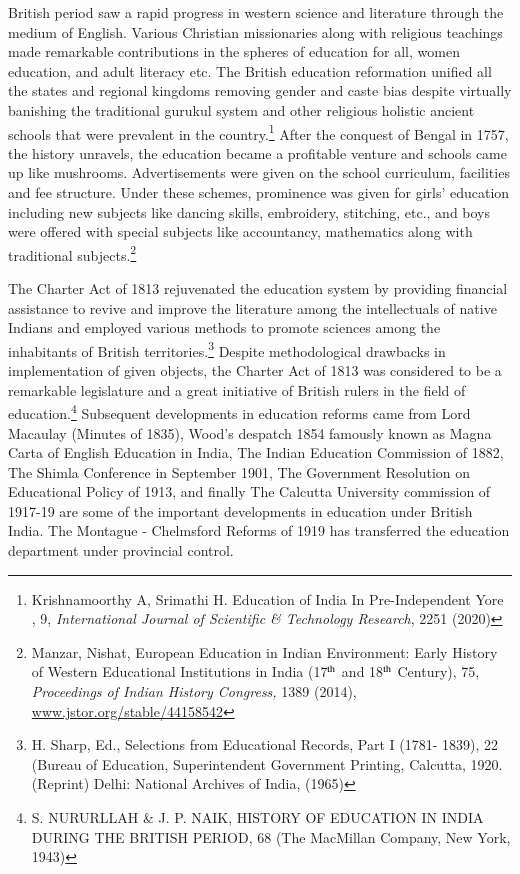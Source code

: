 \begin{multicols}{2}
\noi
British period saw a rapid progress in western science and literature through the medium of
English. Various Christian missionaries along with religious teachings made remarkable
contributions in the spheres of education for all, women education, and adult literacy etc. The
British education reformation unified all the states and regional kingdoms removing gender
and caste bias despite virtually banishing the traditional gurukul system and other religious
holistic ancient schools that were prevalent in the country.\footnote{Krishnamoorthy A, Srimathi H. Education of India In Pre-Independent Yore , 9, \textit{International Journal of Scientific \& Technology Research}, 2251 (2020)} After the conquest of Bengal in 1757, the history unravels, the education became a profitable venture and schools came up
like mushrooms. Advertisements were given on the school curriculum, facilities and fee
structure. Under these schemes, prominence was given for girls’ education including new
subjects like dancing skills, embroidery, stitching, etc., and boys were offered with special
subjects like accountancy, mathematics along with traditional subjects.\footnote{Manzar, Nishat, European Education in Indian Environment: Early History of Western Educational Institutions in India (17$^{\rm th}$ and 18$^{\rm th}$ Century), 75, \textit{Proceedings of Indian History Congress,} 1389 (2014), \url{www.jstor.org/stable/44158542}}

\noi
The Charter Act of 1813 rejuvenated the education system by providing financial assistance
to revive and improve the literature among the intellectuals of native Indians and employed
various methods to promote sciences among the inhabitants of British territories.\footnote{H. Sharp, Ed., Selections from Educational Records, Part I (1781- 1839), 22 (Bureau of Education, Superintendent Government Printing, Calcutta, 1920. (Reprint) Delhi: National Archives of India, (1965)} Despite methodological drawbacks in implementation of given objects, the Charter Act of 1813 was considered to be a remarkable legislature and a great initiative of British rulers in the field of education.\footnote{S. NURURLLAH \& J. P. NAIK, HISTORY OF EDUCATION IN INDIA DURING THE BRITISH
PERIOD, 68 (The MacMillan Company, New York, 1943)} Subsequent developments in education reforms came from Lord Macaulay (Minutes of 1835), Wood's despatch 1854 famously known as Magna Carta of English
Education in India, The Indian Education Commission of 1882, The Shimla Conference in
September 1901, The Government Resolution on Educational Policy of 1913, and finally The
Calcutta University commission of 1917-19 are some of the important developments in
education under British India. The Montague - Chelmsford Reforms of 1919 has transferred
the education department under provincial control.


\end{multicols}
